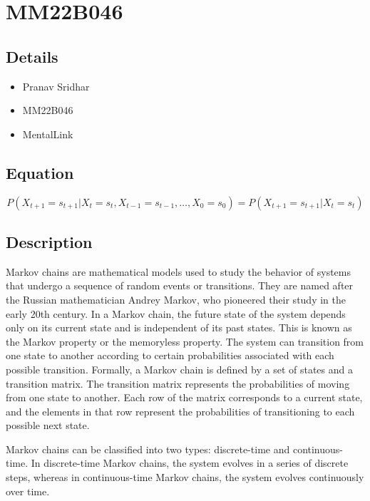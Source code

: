 \documentclass{article}
\begin{document}
\section*{}

\section{MM22B046}
\subsection{Details}

\begin{itemize}
  \item Pranav Sridhar
  \item MM22B046
  \item MentalLink
\end{itemize}
\subsection{Equation}

\begin{equation}
P(X_{t+1}=s_{t+1}|X_{t}=s_{t},X_{t-1}=s_{t-1},\ldots 
,X_{0}=s_{0})=P(X_{t+1}=s_{t+1}|X_{t}=s_{t})
\end{equation}

\subsection{Description}
Markov chains are mathematical models used to study the behavior of 
systems that undergo a sequence of random events or transitions. They are 
named after the Russian mathematician Andrey Markov, who pioneered their 
study in the early 20th century.
In a Markov chain, the future state of the system depends only on its 
current state and is independent of its past states. This is known as the 
Markov property or the memoryless property. The system can transition from 
one state to another according to certain probabilities associated with 
each possible transition.
Formally, a Markov chain is defined by a set of states and a transition 
matrix. The transition matrix represents the probabilities of moving from 
one state to another. Each row of the matrix corresponds to a current 
state, and the elements in that row represent the probabilities of 
transitioning to each possible next state.

Markov chains can be classified into two types: discrete-time and 
continuous-time. In discrete-time Markov chains, the system evolves in a 
series of discrete steps, whereas in continuous-time Markov chains, the 
system evolves continuously over time. \\
\end{document}
